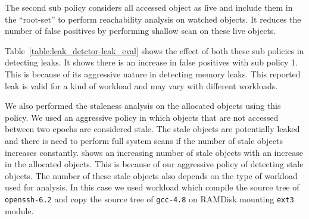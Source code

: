 The second sub policy considers all accessed object as live and include them in the ``root-set'' to perform reachability analysis on watched objects. It reduces the number of false positives by performing shallow scan on these live objects.


Table~\ref{table:leak_detctor-leak_eval} shows the effect of both these sub policies in detecting leaks. It shows there is an increase in false positives with sub policy 1. This is because of its aggressive nature in detecting memory leaks. This reported leak is valid for a kind of workload and may vary with different workloads.








We also performed the staleness analysis on the allocated objects using this policy. We used an aggressive policy in which objects that are not accessed between two epochs are considered stale. The stale objects are potentially leaked and there is need to perform full system scans if the number of stale objects increases constantly.  shows an increasing number of stale objects with an increase in the allocated objects. This is because of our aggressive policy of detecting stale objects. The number of these stale objects also depends on the type of workload used for analysis. In this case we used workload which compile the source tree of \texttt{openssh-6.2} and copy the source tree of \texttt{gcc-4.8} on RAMDisk mounting \texttt{ext3} module.  


